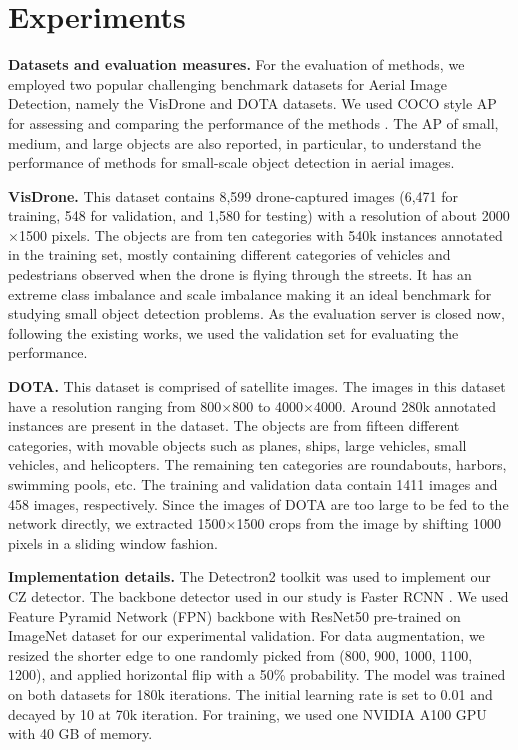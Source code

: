 

\section{Experiments}
\label{sec:experiments}

\noindent \textbf{Datasets and evaluation measures.} For the evaluation of methods, we employed two popular challenging benchmark datasets for Aerial Image Detection, namely the VisDrone \cite{zhu-VisDrone-2018} and DOTA \cite{xia-DOTA-2018} datasets. We used COCO style AP for assessing and comparing the performance of the methods \cite{mscoco-Lin-2014}. The AP of small, medium, and large objects are also reported, in particular, to understand the performance of methods for small-scale object detection in aerial images. 

\noindent \textbf{VisDrone.} This dataset contains  8,599 drone-captured images (6,471 for training, 548 for validation, and 1,580 for testing) with a resolution of about 2000 $\times$1500 pixels. The objects are from ten categories with 540k instances annotated in the training set, mostly containing different categories of vehicles and pedestrians observed when the drone is flying through the streets. It has an extreme class imbalance and scale imbalance making it an ideal benchmark for studying small object detection problems. As the evaluation server is closed now, following the existing works, we used the validation set for evaluating the performance.

\noindent \textbf{DOTA.} This dataset is comprised of satellite images. The images in this dataset have a resolution ranging from 800$\times$800 to 4000$\times$4000. Around 280k annotated instances are present in the dataset. The objects are from fifteen different categories, with movable objects such as planes, ships, large vehicles, small vehicles, and helicopters. The remaining ten categories are roundabouts, harbors, swimming pools, etc. The training and validation data contain 1411 images and 458 images, respectively. Since the images of DOTA are too large to be fed to the network directly, we extracted 1500$\times$1500 crops from the image by shifting 1000 pixels in a sliding window fashion.

\noindent \textbf{Implementation details.} The Detectron2 toolkit \cite{detectron2-wu-2019} was used to implement our CZ detector. The backbone detector used in our study is Faster RCNN \cite{faster_rcnn-Ren-2015}. We used Feature Pyramid Network (FPN) \cite{fpn-Lin-2017} backbone with ResNet50 \cite{resnet-He-2016}  pre-trained on ImageNet \cite{imagenet-Russakovsky-2015} dataset for our experimental validation. For data augmentation, we resized the shorter edge to one randomly picked from (800, 900, 1000, 1100, 1200), and applied horizontal flip with a 50\% probability. The model was trained on both datasets for 180k iterations. The initial learning rate is set to 0.01 and decayed by 10 at 70k iteration. For training, we used one NVIDIA A100 GPU with 40 GB of memory.


